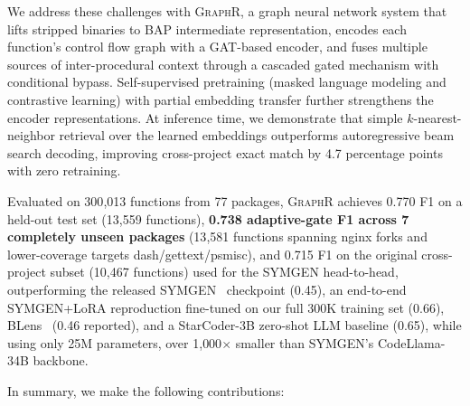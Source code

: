 \documentclass[sigconf,nonacm]{acmart}
\newcommand{\sysname}{\textsc{GraphR}}
\begin{document}
We address these challenges with \sysname{}, a graph neural network system that lifts stripped binaries to BAP intermediate representation, encodes each function's control flow graph with a GAT-based encoder, and fuses multiple sources of inter-procedural context through a cascaded gated mechanism with conditional bypass. Self-supervised pretraining (masked language modeling and contrastive learning) with partial embedding transfer further strengthens the encoder representations. At inference time, we demonstrate that simple $k$-nearest-neighbor retrieval over the learned embeddings outperforms autoregressive beam search decoding, improving cross-project exact match by 4.7 percentage points with zero retraining.

Evaluated on 300{,}013 functions from 77 packages, \sysname{} achieves 0.770 F1 on a held-out test set (13{,}559 functions), \textbf{0.738 adaptive-gate F1 across 7 completely unseen packages} (13{,}581 functions spanning nginx forks and lower-coverage targets dash/gettext/psmisc), and 0.715 F1 on the original cross-project subset (10{,}467 functions) used for the SYMGEN head-to-head, outperforming the released SYMGEN~\cite{symgen} checkpoint (0.45), an end-to-end SYMGEN+LoRA reproduction fine-tuned on our full 300K training set (0.66), BLens~\cite{blens} (0.46 reported), and a StarCoder-3B zero-shot LLM baseline (0.65), while using only 25M parameters, over 1{,}000$\times$ smaller than SYMGEN's CodeLlama-34B backbone.

In summary, we make the following contributions:
\end{document}
